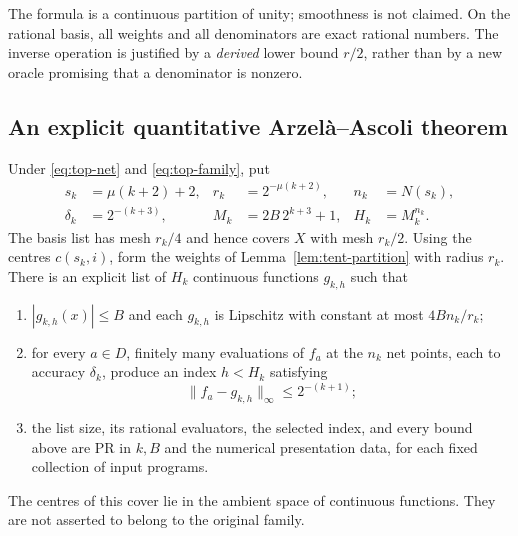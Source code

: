 The formula is a continuous partition of unity; smoothness is not
claimed.  On the rational basis, all weights and all denominators are
exact rational numbers.  The inverse operation is justified by a
\emph{derived} lower bound $r/2$, rather than by a new oracle promising
that a denominator is nonzero.

\subsection{An explicit quantitative Arzel\`a--Ascoli theorem}

\begin{theorem}
\label{thm:quant-ascoli}
Under \eqref{eq:top-net} and \eqref{eq:top-family}, put
\begin{align*}
 s_k&=\mu(k+2)+2,& r_k&=2^{-\mu(k+2)},& n_k&=N(s_k),\\
 \delta_k&=2^{-(k+3)},&
 M_k&=2B\,2^{k+3}+1,& H_k&=M_k^{n_k}.
\end{align*}
The basis list has mesh $r_k/4$ and hence covers $X$ with mesh $r_k/2$.
Using the centres $c(s_k,i)$, form the weights of
Lemma~\ref{lem:tent-partition} with radius $r_k$.
There is an explicit list of $H_k$ continuous functions $g_{k,h}$
such that
\begin{enumerate}
 \item $|g_{k,h}(x)|\le B$ and each $g_{k,h}$ is Lipschitz with
 constant at most $4Bn_k/r_k$;
 \item for every $a\in D$, finitely many evaluations of $f_a$ at the
 $n_k$ net points, each to accuracy $\delta_k$, produce an index
 $h<H_k$ satisfying
 \begin{equation}\label{eq:ascoli-cover}
  \|f_a-g_{k,h}\|_\infty\le 2^{-(k+1)};
 \end{equation}
 \item the list size, its rational evaluators, the selected index, and
 every bound above are PR in $k,B$ and the numerical presentation data,
 for each fixed collection of input programs.
\end{enumerate}
The centres of this cover lie in the ambient space of continuous
functions.  They are not asserted to belong to the original family.
\end{theorem}

